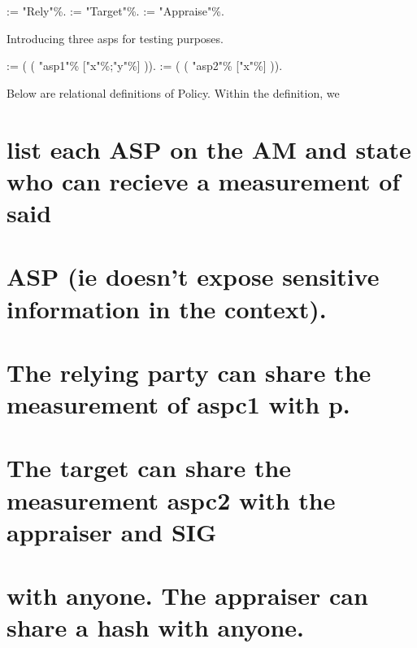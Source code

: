\documentclass[12pt]{report}
\begin{document}
 
\begin{coqdoccode}
\coqdocemptyline
\coqdocnoindent
{}  := "Rely"\%.\coqdoceol
\coqdocnoindent
{}  := "Target"\%.\coqdoceol
\coqdocnoindent
{}  := "Appraise"\%.\coqdoceol
\coqdocemptyline
\end{coqdoccode}
Introducing three asps for testing purposes. 
\begin{coqdoccode}
\coqdocnoindent
{}  :=\coqdoceol
\coqdocindent{1.00em}
(   ( "asp1"\% ["x"\%;"y"\%]  )).\coqdoceol
\coqdocnoindent
{}  :=\coqdoceol
\coqdocindent{1.00em}
(   ( "asp2"\% ["x"\%]  )).\coqdoceol
\coqdocemptyline
\end{coqdoccode}
Below are relational definitions of Policy. Within the definition, we
\section{list each ASP on the AM and state who can recieve a measurement of said}


\section{ASP (ie doesn't expose sensitive information in the context).}


\section{ }


\section{The relying party can share the measurement of aspc1 with p.}


\section{The target can share the measurement aspc2 with the appraiser and SIG}


\section{with anyone. The appraiser can share a hash with anyone.}
\end{document}
